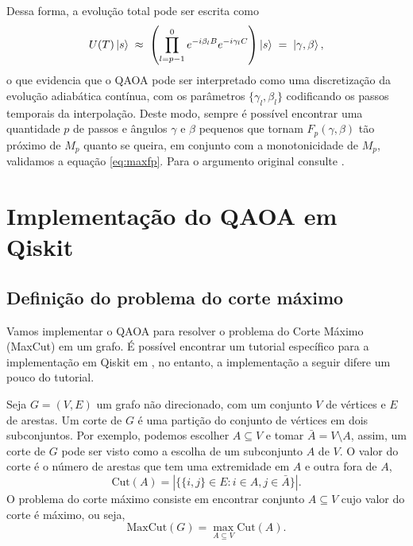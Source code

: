 Dessa forma, a evolução total pode ser escrita como
\begin{equation}
U(T)\ket{s} \;\approx\;
\left(\prod_{l=p-1}^{0} e^{-i\beta_l B}e^{-i\gamma_l C}\right)\ket{s}
\;=\; \ket{\gamma,\beta},
\end{equation}
o que evidencia que o QAOA pode ser interpretado como uma discretização da evolução adiabática contínua, com os parâmetros $\{\gamma_l,\beta_l\}$ codificando os passos temporais da interpolação. Deste modo, sempre é possível encontrar uma quantidade $p$ de passos e ângulos $\gamma$ e $\beta$ pequenos que tornam $F_p(\gamma, \beta)$ tão próximo de $M_p$ quanto se queira, em conjunto com a monotonicidade de $M_p$, validamos a equação \eqref{eq:maxfp}. Para o argumento original consulte \cite[seção~VI]{farhi2014quantumapproximateoptimizationalgorithm}.

\section{Implementação do QAOA em Qiskit}

\subsection{Definição do problema do corte máximo}\label{sec:cm}

Vamos implementar o QAOA para resolver o problema do Corte Máximo (MaxCut) em um grafo. É possível encontrar um tutorial específico para a implementação em Qiskit em \cite{ibm_qaoa_tutorial}, no entanto, a implementação a seguir difere um pouco do tutorial.

Seja $G=(V,E)$ um grafo não direcionado, com um conjunto $V$ de vértices e $E$ de arestas. Um corte de $G$ é uma partição do conjunto de vértices em dois subconjuntos. Por exemplo, podemos escolher $A\subseteq V$ e tomar $\bar{A}=V\setminus A$, assim, um corte de $G$ pode ser visto como a escolha de um subconjunto $A$ de $V$. O valor do corte é o número de arestas que tem uma extremidade em $A$ e outra fora de $A$,
\begin{equation}
    \text{Cut}(A) = |\{\{i,j\}\in E: i\in A, j\in \bar{A}\}|.
\end{equation}
O problema do corte máximo consiste em encontrar conjunto $A\subseteq V$ cujo valor do corte é máximo, ou seja,
\begin{equation}
    \text{MaxCut}(G) = \max_{A\subseteq V} \text{Cut}(A).
\end{equation}

